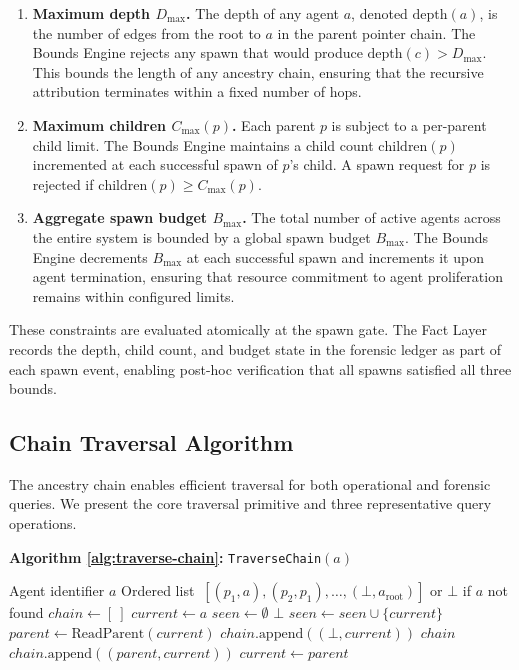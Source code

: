 \begin{enumerate}
    \item \textbf{Maximum depth $D_{\max}$.} The depth of any agent $a$, denoted $\text{depth}(a)$, is the number of edges from the root to $a$ in the parent pointer chain. The Bounds Engine rejects any spawn that would produce $\text{depth}(c) > D_{\max}$. This bounds the length of any ancestry chain, ensuring that the recursive attribution terminates within a fixed number of hops.
    \item \textbf{Maximum children $C_{\max}(p)$.} Each parent $p$ is subject to a per-parent child limit. The Bounds Engine maintains a child count $\text{children}(p)$ incremented at each successful spawn of $p$'s child. A spawn request for $p$ is rejected if $\text{children}(p) \geq C_{\max}(p)$.
    \item \textbf{Aggregate spawn budget $B_{\max}$.} The total number of active agents across the entire system is bounded by a global spawn budget $B_{\max}$. The Bounds Engine decrements $B_{\max}$ at each successful spawn and increments it upon agent termination, ensuring that resource commitment to agent proliferation remains within configured limits.
\end{enumerate}

These constraints are evaluated atomically at the spawn gate. The Fact Layer records the depth, child count, and budget state in the forensic ledger as part of each spawn event, enabling post-hoc verification that all spawns satisfied all three bounds.

\subsection{Chain Traversal Algorithm}\label{sec:chain-traversal-algorithm}

The ancestry chain enables efficient traversal for both operational and forensic queries. We present the core traversal primitive and three representative query operations.

\bigskip
\noindent\textbf{Algorithm \ref{alg:traverse-chain}: } \texttt{TraverseChain}$(a)$

\begin{algorithm}
\caption{TraverseChain$(a)$: Returns the full ancestry chain of agent $a$ as an ordered list from immediate parent to root.}
\label{alg:traverse-chain}
\begin{algorithmic}
\Require Agent identifier $a$
\Ensure Ordered list $\ [(p_1, a), (p_2, p_1), \ldots, (\bot, a_{\text{root}})]$ or $\bot$ if $a$ not found
\State $chain \gets [\ ]$
\State $current \gets a$
\State $seen \gets \emptyset$
\Loop
        \State \Return $\bot$ 
    \EndIf
    \State $seen \gets seen \cup \{current\}$
    \State $parent \gets \text{ReadParent}(current)$
        \State $chain.\text{append}((\bot, current))$
        \State \Return $chain$
    \EndIf
    \State $chain.\text{append}((parent, current))$
    \State $current \gets parent$
\EndLoop
\end{algorithmic}
\end{algorithm}

